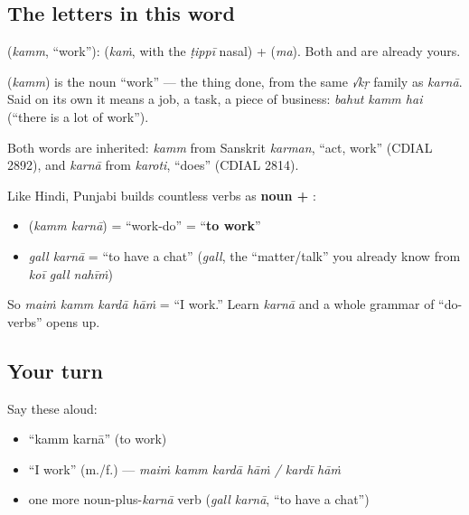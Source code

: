 \subsection*{The letters in this word}
\textbf{} (\emph{kamm}, \textquotedblleft{}work\textquotedblright{}): \textbf{} (\emph{kaṁ}, with the \emph{ṭippī} nasal) + \textbf{} (\emph{ma}). Both \textbf{} and \textbf{} are already yours.

\begin{cousinweb}
\textbf{} (\emph{kamm}) is the noun \textquotedblleft{}work\textquotedblright{} — the thing done, from the same \emph{√kṛ} family as \emph{karnā}. Said on its own it means a job, a task, a piece of business: \emph{bahut kamm hai} (\textquotedblleft{}there is a lot of work\textquotedblright{}).

Both words are inherited: \emph{kamm} from Sanskrit \emph{karman}, \textquotedblleft{}act, work\textquotedblright{} (CDIAL 2892), and \emph{karnā} from \emph{karoti}, \textquotedblleft{}does\textquotedblright{} (CDIAL 2814).
\end{cousinweb}

\begin{grammarlens}[title={Grammar Lens: noun + \pa{ਕਰਨਾ}}]
Like Hindi, Punjabi builds countless verbs as \textbf{noun + }:

\begin{itemize}
\raggedright
  \item \textbf{ } (\emph{kamm karnā}) = \textquotedblleft{}work-do\textquotedblright{} = \textquotedblleft{}\textbf{to work}\textquotedblright{}
  \item \emph{gall karnā} = \textquotedblleft{}to have a chat\textquotedblright{} (\emph{gall}, the \textquotedblleft{}matter/talk\textquotedblright{} you already know from \emph{koī gall nahīṁ})
\end{itemize}

So \emph{maiṁ kamm kardā hāṁ} = \textquotedblleft{}I work.\textquotedblright{} Learn \emph{karnā} and a whole grammar of \textquotedblleft{}do-verbs\textquotedblright{} opens up.
\end{grammarlens}

\subsection*{Your turn}
Say these aloud:

\begin{itemize}
\raggedright
  \item \textquotedblleft{}kamm karnā\textquotedblright{} (to work)
  \item \textquotedblleft{}I work\textquotedblright{} (m./f.) — \emph{maiṁ kamm kardā hāṁ / kardī hāṁ}
  \item one more noun-plus-\emph{karnā} verb (\emph{gall karnā}, \textquotedblleft{}to have a chat\textquotedblright{})
\end{itemize}

